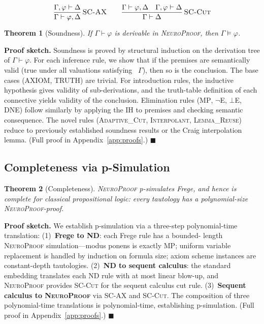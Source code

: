 \documentclass[conference]{IEEEtran}
\newtheorem{theorem}{Theorem}[section]
\newenvironment{proof}[1][Proof]{\textbf{#1.} }{\hfill$\blacksquare$}
\newcommand{\entails}{\vDash}
\newcommand{\proves}{\vdash}
\newcommand{\dlnot}{\neg}
\newcommand{\dlbot}{\bot}
\newcommand{\NP}{\textsc{NeuroProof}}
\newcommand{\infrule}[3]{
  \dfrac{\displaystyle #2}{\displaystyle #3}\,\textsc{#1}
}
\begin{document}
\medskip
\begin{gather}
  \infrule{SC-AX}
    {\Gamma, \varphi \proves \Delta}
    {\Gamma \proves \varphi, \Delta}
  \qquad
  \infrule{SC-Cut}
    {\Gamma \proves \varphi, \Delta \quad
     \Gamma, \varphi \proves \Delta}
    {\Gamma \proves \Delta}
  \label{eq:sc-bridge}
\end{gather}

\begin{theorem}[Soundness]
  \label{thm:soundness}
  If $\Gamma \proves \varphi$ is derivable in \NP{}, then
  $\Gamma \entails \varphi$.
\end{theorem}
\begin{proof}[Proof sketch]
  Soundness is proved by structural induction on the derivation tree of
  $\Gamma \proves \varphi$.  For each inference rule, we show that if the
  premises are semantically valid (true under all valuations satisfying
 ~$\Gamma$), then so is the conclusion.  The base cases
  (\textsc{AXIOM}, \textsc{TRUTH}) are trivial.  For introduction rules,
  the inductive hypothesis gives validity of sub-derivations, and the
  truth-table definition of each connective yields validity of the
  conclusion.  Elimination rules (\textsc{MP}, \textsc{$\dlnot$E},
  \textsc{$\dlbot$E}, \textsc{DNE}) follow similarly by applying the IH
  to premises and checking semantic consequence.  The novel rules
  (\textsc{Adaptive\_Cut}, \textsc{Interpolant}, \textsc{Lemma\_Reuse})
  reduce to previously established soundness results or the Craig
  interpolation lemma.
  (Full proof in Appendix~\ref{app:proofs}.)
\end{proof}

\subsection{Completeness via p-Simulation}

\begin{theorem}[Completeness]
  \label{thm:completeness}
  \NP{} p-simulates Frege, and hence is complete for classical
  propositional logic: every tautology has a polynomial-size
  \NP{}-proof.
\end{theorem}
\begin{proof}[Proof sketch]
  We establish p-simulation via a three-step polynomial-time
  translation: (1)~\textbf{Frege to ND}: each Frege rule has a bounded-
  length \NP{} simulation---modus ponens is exactly \textsc{MP};
  uniform variable replacement is handled by induction on formula size;
  axiom scheme instances are constant-depth tautologies.  (2)~\textbf{ND
  to sequent calculus}: the standard embedding translates each ND rule
  with at most linear blow-up, and \NP{} provides \textsc{SC-Cut} for the
  sequent calculus cut rule.  (3)~\textbf{Sequent calculus to \NP{}}
  via \textsc{SC-AX} and \textsc{SC-Cut}.  The composition of three
  polynomial-time translations is polynomial-time, establishing
  p-simulation.
  (Full proof in Appendix~\ref{app:proofs}.)
\end{proof}
\end{document}
